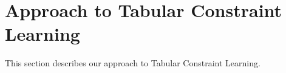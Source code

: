 \documentclass{sig-alternate-05-2015}
\newcommand{\constraints}{\ensuremath{\mathcal{T}}\xspace}
\newcommand{\format}[1]{\textit{#1}\xspace}
\newcommand{\template}{\format{constraint template}}
\newcommand{\dependencies}{\ensuremath{\mathcal{D}}\xspace}
\newcommand{\groups}{\ensuremath{\mathcal{G}}\xspace}
\begin{document}
%



\newcommand{\tcl}{Tabular Constraint Learning}
\section{Approach to Tabular Constraint Learning}
This section describes our approach to \tcl.
\end{document}
